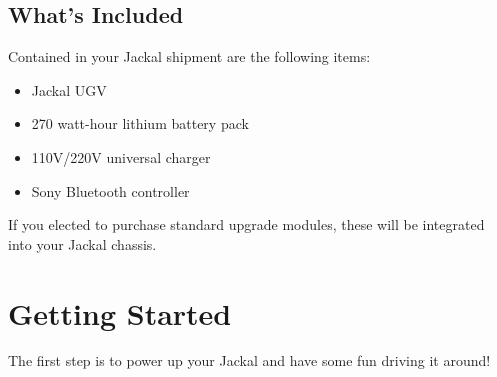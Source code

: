\documentclass[]{article}
\begin{document}
\subsection{What's Included}

Contained in your Jackal shipment are the following items:

\begin{itemize}
  \item Jackal UGV
  \item 270 watt-hour lithium battery pack
  \item 110V/220V universal charger
  \item Sony Bluetooth controller
\end{itemize}

If you elected to purchase standard upgrade modules, these will be integrated into your Jackal chassis.

\section{Getting Started}

The first step is to power up your Jackal and have some fun driving it around!
\end{document}
